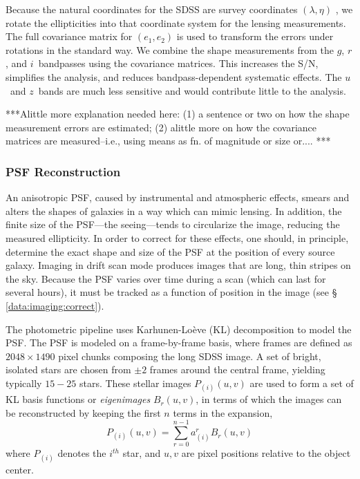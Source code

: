 \documentclass{emulateapj}
\newcommand{\umag}{$u$}
\newcommand{\gmag}{$g$}
\newcommand{\rmag}{$r$}
\newcommand{\imag}{$i$}
\newcommand{\zmag}{$z$}
\begin{document}
Because the natural coordinates for the SDSS are survey coordinates
$(\lambda,\eta)$ \citep{Stough02},
we rotate the ellipticities into that coordinate system for the lensing
measurements.  The full covariance matrix for $(e_1,e_2)$ is used to transform
the errors under rotations in the standard way.  We combine the shape
measurements from the \gmag, \rmag, and \imag\ bandpasses using the covariance
matrices.  This increases the S/N, simplifies the analysis, and reduces
bandpass-dependent systematic effects.  The \umag\ and \zmag\ bands are much
less sensitive and would contribute little to the analysis.

***Alittle more explanation needed here: (1) a sentence or two on how the 
shape measurement errors are estimated; (2) alittle more on how the covariance matrices 
are measured--i.e., using means as fn. of magnitude or size or.... ***

\subsubsection{PSF Reconstruction} \label{data:imaging:psf}

An anisotropic PSF, caused by instrumental and atmospheric effects, 
smears and alters the shapes of galaxies in a way which can mimic
lensing. In addition, the finite size of the PSF---the seeing---tends to
circularize the image, reducing the measured ellipticity.
In order to correct for these effects, one should, in
principle, determine the exact shape and size of the PSF at the position of 
every source galaxy.  Imaging in drift scan mode produces 
images that are long, thin stripes
on the sky.  Because the PSF varies over time during a scan  (which 
can last for several hours), it must be tracked as a function
of position in the image (see \S
\ref{data:imaging:correct}).

The photometric pipeline uses Karhunen-Lo\`{e}ve (KL) decomposition
\citep{Hot33,Kar47,Loeve48} to model the PSF. The PSF is modeled on a
frame-by-frame basis, where frames are defined as $2048\times 1490$
pixel chunks composing the long SDSS image.  
A set of bright, isolated stars are chosen from 
$\pm 2$ frames around the central frame, yielding typically $15-25$ stars.  
These stellar images $P_{(i)}(u,v)$ are used to form a set of KL basis functions or 
\emph{eigenimages} $B_r(u,v)$, in terms of which the images can be reconstructed 
by keeping the first $n$ terms in the expansion, 
\begin{equation}
P_{(i)}(u,v) = \sum_{r=0}^{n-1}a_{(i)}^r B_r(u,v)
\end{equation}
where $P_{(i)}$ denotes the $i^{th}$ star, and $u,v$ are 
pixel positions relative to the object center.
\end{document}

